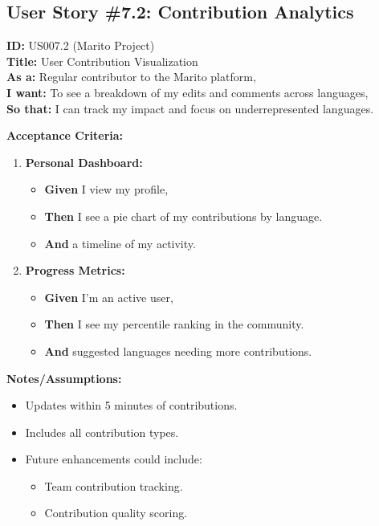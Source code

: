 \documentclass[12pt]{article}
\begin{document}
\subsection{User Story \#7.2: Contribution Analytics}

\textbf{ID:} US007.2 (Marito Project) \\
\textbf{Title:} User Contribution Visualization \\
\textbf{As a:} Regular contributor to the Marito platform, \\
\textbf{I want:} To see a breakdown of my edits and comments across languages, \\
\textbf{So that:} I can track my impact and focus on underrepresented languages.

\vspace{1em}
\textbf{Acceptance Criteria:}
\begin{enumerate}
    \item \textbf{Personal Dashboard:}
    \begin{itemize}
        \item \textbf{Given} I view my profile,
        \item \textbf{Then} I see a pie chart of my contributions by language.
        \item \textbf{And} a timeline of my activity.
    \end{itemize}

    \item \textbf{Progress Metrics:}
    \begin{itemize}
        \item \textbf{Given} I'm an active user,
        \item \textbf{Then} I see my percentile ranking in the community.
        \item \textbf{And} suggested languages needing more contributions.
    \end{itemize}
\end{enumerate}

\vspace{1em}
\textbf{Notes/Assumptions:}
\begin{itemize}
    \item Updates within 5 minutes of contributions.
    \item Includes all contribution types.
    \item Future enhancements could include:
    \begin{itemize}
        \item Team contribution tracking.
        \item Contribution quality scoring.
    \end{itemize}
\end{itemize}
\end{document}
